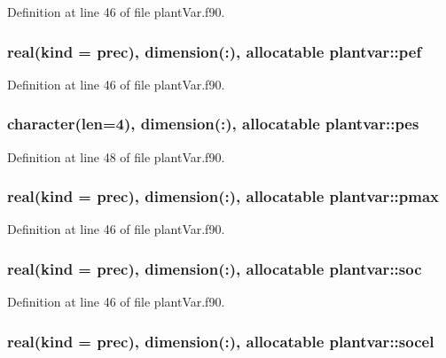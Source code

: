 Definition at line 46 of file plant\-Var.\-f90.

\hypertarget{classplantvar_adae0478dc0dc873750b3f2ff1cd17f47}{
\subsubsection[{pef}]{\setlength{\rightskip}{0pt plus 5cm}real(kind = prec), dimension(\-:), allocatable plantvar\-::pef}}\label{classplantvar_adae0478dc0dc873750b3f2ff1cd17f47}


Definition at line 46 of file plant\-Var.\-f90.

\hypertarget{classplantvar_a8b75644cc6f0b1728b0fdcd7c575c177}{
\subsubsection[{pes}]{\setlength{\rightskip}{0pt plus 5cm}character(len=4), dimension(\-:), allocatable plantvar\-::pes}}\label{classplantvar_a8b75644cc6f0b1728b0fdcd7c575c177}


Definition at line 48 of file plant\-Var.\-f90.

\hypertarget{classplantvar_aab06737bb534df1a69fff1f6f601a72a}{
\subsubsection[{pmax}]{\setlength{\rightskip}{0pt plus 5cm}real(kind = prec), dimension(\-:), allocatable plantvar\-::pmax}}\label{classplantvar_aab06737bb534df1a69fff1f6f601a72a}


Definition at line 46 of file plant\-Var.\-f90.

\hypertarget{classplantvar_abcd233bb37be100040f7c48ba5700daa}{
\subsubsection[{soc}]{\setlength{\rightskip}{0pt plus 5cm}real(kind = prec), dimension(\-:), allocatable plantvar\-::soc}}\label{classplantvar_abcd233bb37be100040f7c48ba5700daa}


Definition at line 46 of file plant\-Var.\-f90.

\hypertarget{classplantvar_a325e0974aedb888a4814e7d9479c67d3}{
\subsubsection[{socel}]{\setlength{\rightskip}{0pt plus 5cm}real(kind = prec), dimension(\-:), allocatable plantvar\-::socel}}\label{classplantvar_a325e0974aedb888a4814e7d9479c67d3}


